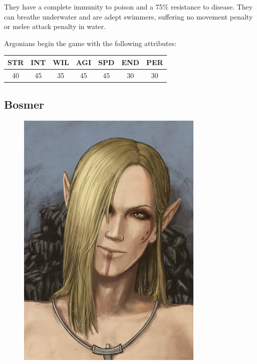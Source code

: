\documentclass[12pt]{book}
\begin{document}
They have a complete immunity to poison and a 75\% resistance to disease. They can breathe underwater and are adept swimmers, suffering no movement penalty or melee attack penalty in water.

Argonians begin the game with the following attributes:

\begin{center}
\begin{tabular}{|c|c|c|c|c|c|c|}
\hline
STR & INT & WIL & AGI & SPD & END & PER\\ \hline
40 & 45 & 35 & 45 & 45 & 30 & 30\\ \hline
\end{tabular}
\end{center}

\subsection{Bosmer}
\begin{figure}
	\includegraphics[width=\textwidth]{Bosmer.png}
\end{figure}
\end{document}
